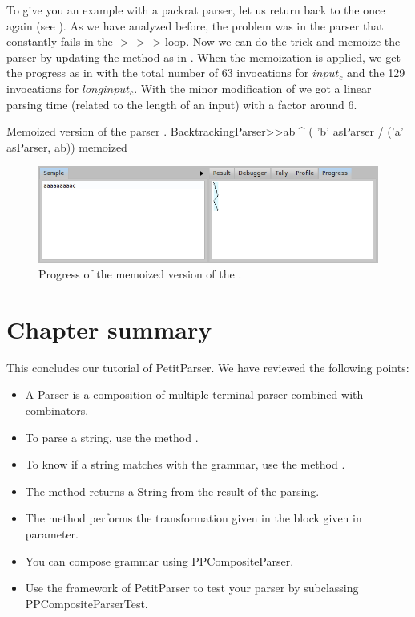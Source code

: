 \documentclass[a4paper,10pt,twoside]{book}
\begin{document}
To give you an example with a packrat parser, let us return back to the  once again (see ).
As we have analyzed before, the problem was in the parser  that constantly fails in the  ->  ->  ->  loop.
Now we can do the trick and memoize the parser  by updating the method  as in .
When the memoization is applied, we get the progress as in  with the total number of 63 invocations for $input_c$ and the 129 invocations for $longinput_c$.
With the minor modification of  we got a linear parsing time (related to the length of an input)  with a factor around 6.

\begin{script}{Memoized version of the parser . \label{scr:pp/backtrackingParser-memo}}
BacktrackingParser>>ab
  ^ ( 'b' asParser / 
	    ('a' asParser, ab)) memoized
\end{script}

\begin{figure}
  \begin{center}
    \includegraphics[width=\linewidth]{example-progressAaac-memo}
    \caption{Progress of the memoized version of the . \label{fig:pp/example-progressAaac-memo}}
  \end{center}
\end{figure}

\section{Chapter summary}

This concludes our tutorial of PetitParser. We have reviewed the following points:


\begin{itemize}
\item A Parser is a composition of multiple terminal parser combined with combinators.
\item To parse a string, use the method .
\item To know if a string matches with the grammar, use the method .
\item The method  returns a String from the result of the parsing.
\item The method \ct{==>} performs the transformation given in the block given in parameter.
\item You can compose grammar using PPCompositeParser.
\item Use the framework of PetitParser to test your parser by subclassing PPCompositeParserTest.
\end{itemize}
\end{document}
